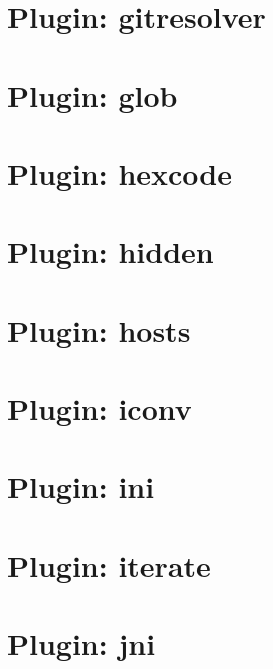 \documentclass[twoside]{book}
\newcommand{\+}{\discretionary{\mbox{\scriptsize$\hookleftarrow$}}{}{}}
\begin{document}
\chapter{Plugin\+: gitresolver}
\label{md_src_plugins_gitresolver_README}
\hypertarget{md_src_plugins_gitresolver_README}{}

\chapter{Plugin\+: glob}
\label{md_src_plugins_glob_README}
\hypertarget{md_src_plugins_glob_README}{}

\chapter{Plugin\+: hexcode}
\label{md_src_plugins_hexcode_README}
\hypertarget{md_src_plugins_hexcode_README}{}

\chapter{Plugin\+: hidden}
\label{md_src_plugins_hidden_README}
\hypertarget{md_src_plugins_hidden_README}{}

\chapter{Plugin\+: hosts}
\label{md_src_plugins_hosts_README}
\hypertarget{md_src_plugins_hosts_README}{}

\chapter{Plugin\+: iconv}
\label{md_src_plugins_iconv_README}
\hypertarget{md_src_plugins_iconv_README}{}

\chapter{Plugin\+: ini}
\label{md_src_plugins_ini_README}
\hypertarget{md_src_plugins_ini_README}{}

\chapter{Plugin\+: iterate}
\label{md_src_plugins_iterate_README}
\hypertarget{md_src_plugins_iterate_README}{}

\chapter{Plugin\+: jni}
\label{md_src_plugins_jni_README}
\hypertarget{md_src_plugins_jni_README}{}

\end{document}
